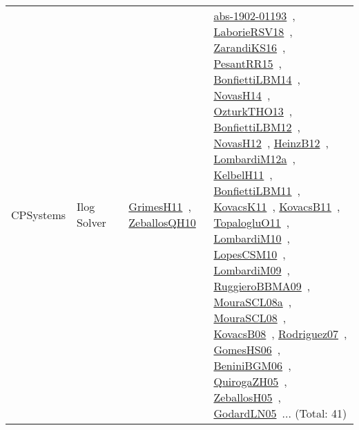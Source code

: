 {\begin{longtable}{lp{3cm}>{\raggedright\arraybackslash}p{6cm}>{\raggedright\arraybackslash}p{6cm}>{\raggedright\arraybackslash}p{8cm}}
CPSystems & Ilog Solver &  & \href{works/GrimesH11.pdf}{GrimesH11}~\cite{GrimesH11}, \href{works/ZeballosQH10.pdf}{ZeballosQH10}~\cite{ZeballosQH10} & \href{works/abs-1902-01193.pdf}{abs-1902-01193}~\cite{abs-1902-01193}, \href{works/LaborieRSV18.pdf}{LaborieRSV18}~\cite{LaborieRSV18}, \href{works/ZarandiKS16.pdf}{ZarandiKS16}~\cite{ZarandiKS16}, \href{works/PesantRR15.pdf}{PesantRR15}~\cite{PesantRR15}, \href{works/BonfiettiLBM14.pdf}{BonfiettiLBM14}~\cite{BonfiettiLBM14}, \href{works/NovasH14.pdf}{NovasH14}~\cite{NovasH14}, \href{works/OzturkTHO13.pdf}{OzturkTHO13}~\cite{OzturkTHO13}, \href{works/BonfiettiLBM12.pdf}{BonfiettiLBM12}~\cite{BonfiettiLBM12}, \href{works/NovasH12.pdf}{NovasH12}~\cite{NovasH12}, \href{works/HeinzB12.pdf}{HeinzB12}~\cite{HeinzB12}, \href{works/LombardiM12a.pdf}{LombardiM12a}~\cite{LombardiM12a}, \href{works/KelbelH11.pdf}{KelbelH11}~\cite{KelbelH11}, \href{works/BonfiettiLBM11.pdf}{BonfiettiLBM11}~\cite{BonfiettiLBM11}, \href{works/KovacsK11.pdf}{KovacsK11}~\cite{KovacsK11}, \href{works/KovacsB11.pdf}{KovacsB11}~\cite{KovacsB11}, \href{works/TopalogluO11.pdf}{TopalogluO11}~\cite{TopalogluO11}, \href{works/LombardiM10.pdf}{LombardiM10}~\cite{LombardiM10}, \href{works/LopesCSM10.pdf}{LopesCSM10}~\cite{LopesCSM10}, \href{works/LombardiM09.pdf}{LombardiM09}~\cite{LombardiM09}, \href{works/RuggieroBBMA09.pdf}{RuggieroBBMA09}~\cite{RuggieroBBMA09}, \href{works/MouraSCL08a.pdf}{MouraSCL08a}~\cite{MouraSCL08a}, \href{works/MouraSCL08.pdf}{MouraSCL08}~\cite{MouraSCL08}, \href{works/KovacsB08.pdf}{KovacsB08}~\cite{KovacsB08}, \href{works/Rodriguez07.pdf}{Rodriguez07}~\cite{Rodriguez07}, \href{works/GomesHS06.pdf}{GomesHS06}~\cite{GomesHS06}, \href{works/BeniniBGM06.pdf}{BeniniBGM06}~\cite{BeniniBGM06}, \href{works/QuirogaZH05.pdf}{QuirogaZH05}~\cite{QuirogaZH05}, \href{works/ZeballosH05.pdf}{ZeballosH05}~\cite{ZeballosH05}, \href{works/GodardLN05.pdf}{GodardLN05}~\cite{GodardLN05}... (Total: 41)\\

\end{longtable}}
